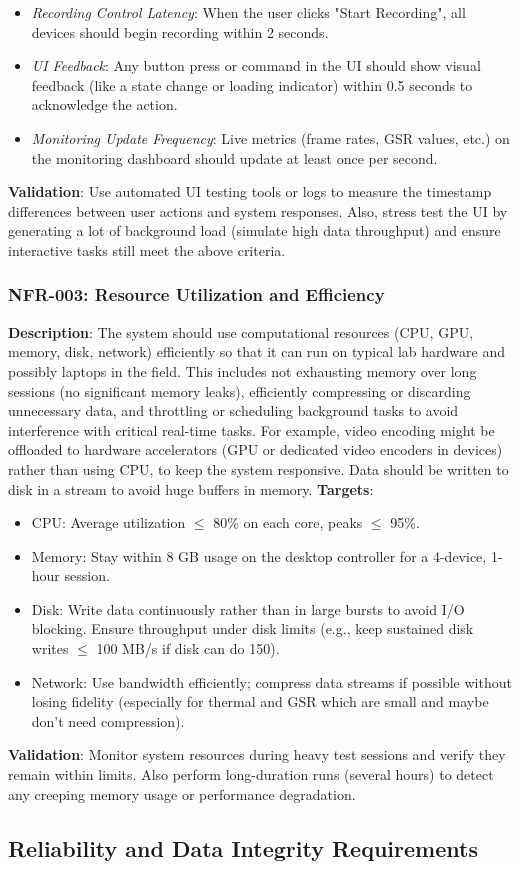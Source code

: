 \documentclass[11pt,a4paper]{report}
\begin{document}
\begin{itemize}
\item \textit{Recording Control Latency}: When the user clicks "Start Recording", all devices should begin recording within 2 seconds.
\item \textit{UI Feedback}: Any button press or command in the UI should show visual feedback (like a state change or loading indicator) within 0.5 seconds to acknowledge the action.
\item \textit{Monitoring Update Frequency}: Live metrics (frame rates, GSR values, etc.) on the monitoring dashboard should update at least once per second.
\end{itemize} \textbf{Validation}: Use automated UI testing tools or logs to measure the timestamp differences between user actions and system responses. Also, stress test the UI by generating a lot of background load (simulate high data throughput) and ensure interactive tasks still meet the above criteria. \subsubsection*{NFR-003: Resource Utilization and Efficiency}
\textbf{Description}: The system should use computational resources (CPU, GPU, memory, disk, network) efficiently so that it can run on typical lab hardware and possibly laptops in the field. This includes not exhausting memory over long sessions (no significant memory leaks), efficiently compressing or discarding unnecessary data, and throttling or scheduling background tasks to avoid interference with critical real-time tasks. For example, video encoding might be offloaded to hardware accelerators (GPU or dedicated video encoders in devices) rather than using CPU, to keep the system responsive. Data should be written to disk in a stream to avoid huge buffers in memory. \textbf{Targets}:
\begin{itemize}
\item CPU: Average utilization $\leq$ 80\% on each core, peaks $\leq$ 95\%.
\item Memory: Stay within 8 GB usage on the desktop controller for a 4-device, 1-hour session.
\item Disk: Write data continuously rather than in large bursts to avoid I/O blocking. Ensure throughput under disk limits (e.g., keep sustained disk writes $\leq$ 100 MB/s if disk can do 150).
\item Network: Use bandwidth efficiently; compress data streams if possible without losing fidelity (especially for thermal and GSR which are small and maybe don't need compression).
\end{itemize} \textbf{Validation}: Monitor system resources during heavy test sessions and verify they remain within limits. Also perform long-duration runs (several hours) to detect any creeping memory usage or performance degradation. \subsection{Reliability and Data Integrity Requirements}
\end{document}
